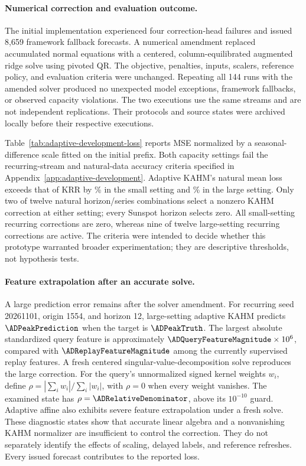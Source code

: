 \paragraph{Numerical correction and evaluation outcome.}
The initial implementation experienced four correction-head failures
and issued 8,659 framework fallback forecasts. A numerical amendment
replaced accumulated normal equations with a centered, column-equilibrated
augmented ridge solve using pivoted QR. The objective, penalties, inputs,
scalers, reference policy, and evaluation criteria were unchanged.
Repeating all 144 runs with the amended solver produced no unexpected
model exceptions, framework fallbacks, or observed capacity violations.
The two executions use the same streams and are not independent
replications. Their protocols and source states were archived locally
before their respective executions.



Table~\ref{tab:adaptive-development-loss} reports MSE normalized by a
seasonal-difference scale fitted on the initial prefix. Both capacity
settings fail the recurring-stream and natural-data accuracy criteria
specified in Appendix~\ref{app:adaptive-development}. Adaptive KAHM's
natural mean loss exceeds that of KRR by \ADSmallKRRExcess\% in the
small setting and \ADLargeKRRExcess\% in the large setting. Only two
of twelve natural horizon/series combinations select a nonzero KAHM
correction at either setting; every Sunspot horizon selects zero.
All small-setting recurring corrections are zero, whereas nine of
twelve large-setting recurring corrections are active. The criteria
were intended to decide whether this prototype warranted broader
experimentation; they are descriptive thresholds, not hypothesis tests.

\paragraph{Feature extrapolation after an accurate solve.}
A large prediction error remains after the solver amendment. For
recurring seed 20261101, origin 1554, and horizon 12, large-setting
adaptive KAHM predicts $\ADPeakPrediction$ when the target is
$\ADPeakTruth$. The largest absolute standardized query feature is
approximately $\ADQueryFeatureMagnitude\times10^6$, compared with
$\ADReplayFeatureMagnitude$ among the currently supervised replay
features. A fresh centered singular-value-decomposition solve reproduces
the large correction. For the query's unnormalized signed kernel weights $w_i$, define
$\rho=|\sum_i w_i|/\sum_i|w_i|$, with $\rho=0$ when every weight
vanishes. The examined state has $\rho=\ADRelativeDenominator$,
above its $10^{-10}$ guard. Adaptive affine
also exhibits severe feature extrapolation under a fresh solve.
These diagnostic states show that accurate linear algebra and a
nonvanishing KAHM normalizer are insufficient to control the correction.
They do not separately identify the effects of scaling, delayed labels,
and reference refreshes. Every issued forecast contributes to the
reported loss.

